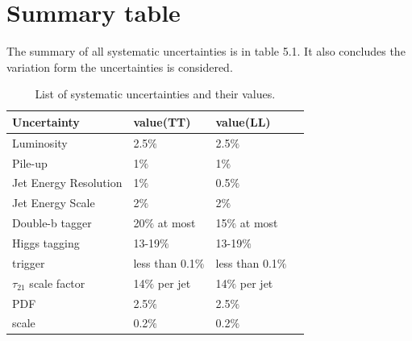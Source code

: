 \clearpage
\section{Summary table}
The summary of all systematic uncertainties is in table 5.1. It also concludes the variation form the uncertainties is considered.
\begin{table}[h!]
  \begin{center}
    \begin{tabular}{l|l|l|l}
    Uncertainty & value(TT) & value(LL) \\
    \hline
    Luminosity &  2.5$\% $ & 2.5$\% $\\
    Pile-up & 1$\% $ & 1$\% $\\
    Jet Energy Resolution &  1$\% $ & 0.5$\% $\\
    Jet Energy Scale &  2$\% $ & 2$\% $\\
    Double-b tagger &  20$\% $ at most & 15$\% $ at most\\
    Higgs tagging & 13-19$\% $ &13-19$\% $ \\
    trigger &  less than 0.1$\% $ & less than 0.1$\% $\\
    $\tau _{21}$ scale factor &  14$\% $ per jet & 14$\% $ per jet\\
    PDF &  2.5$\% $ & 2.5$\% $\\
    scale &  0.2$\% $ & 0.2$\% $\\
    \hline
    \end{tabular}
  \end{center}

  \caption{List of systematic uncertainties and their values.}
\end{table} 